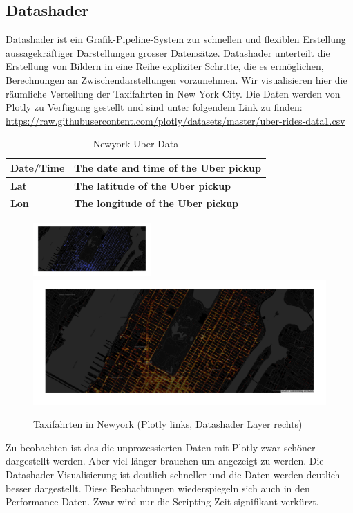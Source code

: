 \documentclass{article}
\begin{document}
\subsection{Datashader}
Datashader ist ein Grafik-Pipeline-System zur schnellen und flexiblen Erstellung aussagekräftiger Darstellungen grosser Datensätze. Datashader unterteilt die Erstellung von Bildern in eine Reihe expliziter Schritte, die es ermöglichen, Berechnungen an Zwischendarstellungen vorzunehmen.\cite{wong_abstract_2013}
\newline
Wir visualisieren hier die räumliche Verteilung der Taxifahrten in New York City. 
Die Daten werden von Plotly zu Verfügung gestellt und sind unter folgendem Link zu finden: \url{https://raw.githubusercontent.com/plotly/datasets/master/uber-rides-data1.csv}

\begin{table}[!h]
\centering
\begin{tabular}{|l|l|}
\hline
\textbf{Date/Time} & \textbf{The date and time of the Uber pickup} \\
\hline
\textbf{Lat} & \textbf{The latitude of the Uber pickup} \\
\hline
\textbf{Lon} & \textbf{The longitude of the Uber pickup} \\
\hline
\end{tabular}
\caption{\label{tab: LE1 Newyork Taxi Data} Newyork Uber Data}
\end{table}



\begin{figure}[!h]
\centering
\includegraphics[width=0.4\textwidth]{img/newyork_plotly.png}
\includegraphics[height=0.18\textwidth]{img/newyork_datashader.png}
\caption{\label{fig: LE1 Plotly vs Datashader} Taxifahrten in Newyork (Plotly links, Datashader Layer rechts)}
\end{figure}

Zu beobachten ist das die unprozessierten Daten mit Plotly zwar schöner dargestellt werden. Aber viel länger brauchen um angezeigt zu werden. Die Datashader Visualisierung ist deutlich schneller und die Daten werden deutlich besser dargestellt.
Diese Beobachtungen wiederspiegeln sich auch in den Performance Daten. Zwar wird nur die Scripting Zeit signifikant verkürzt.
\end{document}

